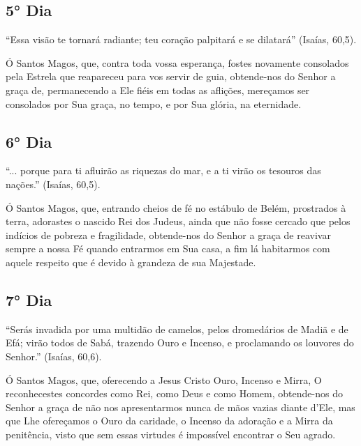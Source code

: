 \documentclass[18pt]{article}
\begin{document}
\textbf{}


\subsection{5° Dia}

“Essa visão te tornará radiante; teu coração palpitará e se dilatará” (Isaías, 60,5).

Ó Santos Magos, que, contra toda vossa esperança, fostes novamente consolados pela Estrela que reapareceu para vos servir de guia, obtende-nos do Senhor a graça de, permanecendo a Ele fiéis em todas as aflições, mereçamos ser consolados por Sua graça, no tempo, e por Sua glória, na eternidade. 


\textbf{}



\subsection{6° Dia}

“... porque para ti afluirão as riquezas do mar, e a ti virão os tesouros das nações.” (Isaías, 60,5).

Ó Santos Magos, que, entrando cheios de fé no estábulo de Belém, prostrados à terra, adorastes o nascido Rei dos Judeus, ainda que não fosse cercado que pelos indícios de pobreza e fragilidade, obtende-nos do Senhor a graça de reavivar sempre a nossa Fé quando entrarmos em Sua casa, a fim lá habitarmos com aquele respeito que é devido à grandeza de sua Majestade. 


\textbf{}



\subsection{7° Dia}

“Serás invadida por uma multidão de camelos, pelos dromedários de Madiã e de Efá; virão todos de Sabá, trazendo Ouro e Incenso, e proclamando os louvores do Senhor.” (Isaías, 60,6).

Ó Santos Magos, que, oferecendo a Jesus Cristo Ouro, Incenso e Mirra, O reconhecestes concordes como Rei, como Deus e como Homem, obtende-nos do Senhor a graça de não nos apresentarmos nunca de mãos vazias diante d’Ele, mas que Lhe ofereçamos o Ouro da caridade, o Incenso da adoração e a Mirra da penitência, visto que sem essas virtudes é impossível encontrar o Seu agrado. 
\end{document}

